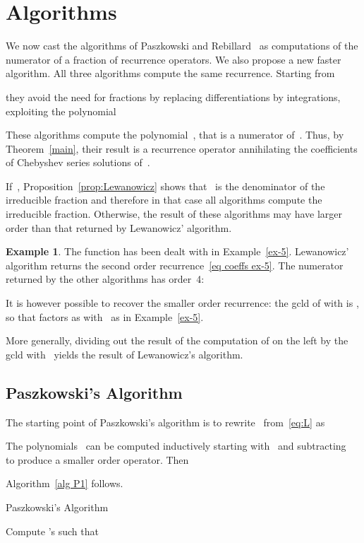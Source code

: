 \documentclass{amsart}
\theoremstyle{definition}
\newtheorem{example}{Example}
\begin{document}
\section{Algorithms}\label{sec:algo}
We now cast the algorithms of 
Paszkowski \cite{Paszkowski1975} and Rebillard~\cite{Rebillard1998} as computations of the numerator of a fraction of recurrence operators. We also propose a new faster algorithm. All three algorithms compute the same recurrence. Starting from

they avoid the need for fractions by replacing differentiations by integrations, exploiting the polynomial

These algorithms compute the polynomial~, that is a numerator of~. Thus, by Theorem~\ref{main}, their result is a recurrence operator annihilating the coefficients of Chebyshev series solutions of~. 

If~, Proposition~\ref{prop:Lewanowicz} shows that~ is the denominator of the irreducible fraction and therefore in that case all algorithms compute the irreducible fraction.
Otherwise, the result of these algorithms may have larger order than that returned by Lewanowicz' algorithm.
\begin{example} The function  has been dealt with in Example~\ref{ex-5}.
Lewanowicz' algorithm returns the second order recurrence~\eqref{eq coeffs ex-5}.
The numerator returned by the other algorithms has order~4:

It is however possible to recover the smaller order recurrence: the gcld of  with  is , so that  factors as  with~ as in Example~\ref{ex-5}.
\end{example} 
More generally, dividing out the result of the computation of  on the left by the gcld with~ yields the result of Lewanowicz's algorithm.
\subsection{Paszkowski's Algorithm}
The starting point of Paszkowski's algorithm is to rewrite~ from~\eqref{eq:L} as

The polynomials~ can be computed inductively starting with~ and subtracting~ to produce a smaller order operator.
Then

Algorithm~\ref{alg P1} follows.
\begin{algorithm}
  \caption{Paszkowski's Algorithm}
  \label{alg P1}
  \begin{algorithmic}
    \REQUIRE 
    \ENSURE 
	\STATE Compute 's such that 
	\STATE 
    	\STATE 
	\ENDFOR
 	\RETURN 
  \end{algorithmic}
\end{algorithm}
\end{document}
